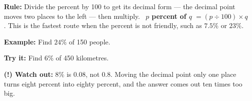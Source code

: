 \documentclass[12pt]{article}
\begin{document}

\begin{formulabox}
\textbf{Rule:} Divide the percent by 100 to get its decimal form --- the decimal
point moves two places to the left --- then multiply.
\ \textbf{$p$ percent of $q$} $= (p \div 100) \times q$. This is the fastest
route when the percent is not friendly, such as $7.5\%$ or $23\%$.
\end{formulabox}

\begin{examplebox}
\textbf{Example:} \quad Find $24\%$ of 150 people.
\end{examplebox}

\begin{tryitbox}
\textbf{Try it:} \quad Find $6\%$ of 450 kilometres.\\[2pt]
\end{tryitbox}

\begin{watchoutbox}
\textbf{(!) Watch out:} $8\%$ is $0.08$, not $0.8$. Moving the decimal point
only one place turns eight percent into eighty percent, and the answer comes out
ten times too big.
\end{watchoutbox}
\end{document}
